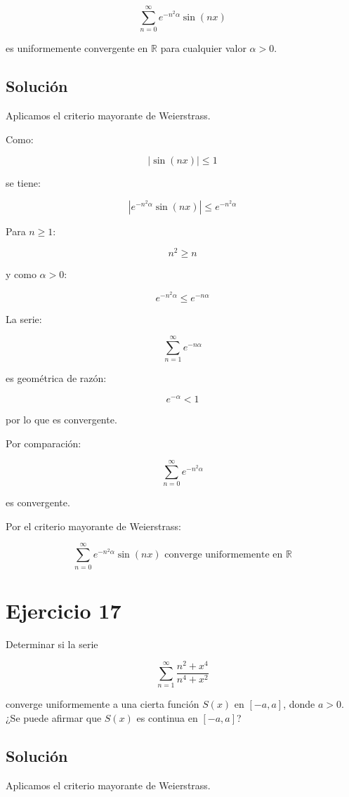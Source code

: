 \documentclass[fleqn]{article}
\begin{document}
	\[
	\sum_{n=0}^{\infty}
	e^{-n^2\alpha}\sin(nx)
	\]

	es uniformemente convergente en $\mathbb{R}$ para cualquier valor $\alpha>0$.

	\subsection{Solución}

	Aplicamos el criterio mayorante de Weierstrass.

	Como:

	\[
	|\sin(nx)|\leq 1
	\]

	se tiene:

	\[
	\left|
	e^{-n^2\alpha}\sin(nx)
	\right|
	\leq
	e^{-n^2\alpha}
	\]

	Para $n\geq1$:

	\[
	n^2\geq n
	\]

	y como $\alpha>0$:

	\[
	e^{-n^2\alpha}
	\leq
	e^{-n\alpha}
	\]

	La serie:

	\[
	\sum_{n=1}^{\infty}e^{-n\alpha}
	\]

	es geométrica de razón:

	\[
	e^{-\alpha}<1
	\]

	por lo que es convergente.

	Por comparación:

	\[
	\sum_{n=0}^{\infty}e^{-n^2\alpha}
	\]

	es convergente.

	Por el criterio mayorante de Weierstrass:

	\[
	\boxed{
	\sum_{n=0}^{\infty}
	e^{-n^2\alpha}\sin(nx)
	\text{ converge uniformemente en }\mathbb{R}
	}
	\]

\section{Ejercicio 17}
	Determinar si la serie

	\[
	\sum_{n=1}^{\infty}
	\frac{n^2+x^4}{n^4+x^2}
	\]

	converge uniformemente a una cierta función $S(x)$ en $[-a,a]$, donde $a>0$.
	¿Se puede afirmar que $S(x)$ es continua en $[-a,a]$?

	\subsection{Solución}

	Aplicamos el criterio mayorante de Weierstrass.
\end{document}
